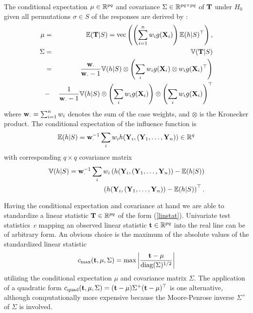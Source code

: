 \documentclass[letter]{article}
\begin{document}
The conditional expectation $\mu \in \mathbb{R}^{pq}$ and covariance 
$\Sigma \in \mathbb{R}^{pq \times pq}$ 
of $\mathbf{T}$ under $H_0$ given
all permutations $\sigma \in S$ of the responses are derived by
\cite{StrasserWeber1999}:
\begin{eqnarray}
\mu & = & \mathbb{E}(\mathbf{T} | S) = \text{vec} \left( \left( \sum_{i = 1}^n w_i g(\mathbf{X}_i) \right) \mathbb{E}(h | S)^\top
\right), \nonumber \\
\Sigma & = & \mathbb{V}(\mathbf{T} | S) \nonumber \\
& = &
    \frac{\mathbf{w}_\cdot}{\mathbf{w}_\cdot - 1}  \mathbb{V}(h | S) \otimes
        \left(\sum_i w_i  g(\mathbf{X}_i) \otimes w_i  g(\mathbf{X}_i)^\top \right)
\label{expectcovar}
\\
& - & \frac{1}{\mathbf{w}_\cdot - 1}  \mathbb{V}(h | S)  \otimes \left(
        \sum_i w_i g(\mathbf{X}_i) \right)
\otimes \left( \sum_i w_i g(\mathbf{X}_i)\right)^\top
\nonumber
\end{eqnarray}
where $\mathbf{w}_\cdot = \sum_{i = 1}^n w_i$ denotes the sum of the case weights,
and $\otimes$ is the Kronecker product. The conditional expectation of the
influence function is
\begin{eqnarray*}
\mathbb{E}(h | S) = \mathbf{w}_\cdot^{-1} \sum_i w_i h(\mathbf{Y}_i, (\mathbf{Y}_1, \dots, \mathbf{Y}_n)) \in
\mathbb{R}^q
\end{eqnarray*}
with corresponding $q \times q$ covariance matrix
\begin{eqnarray*}
\mathbb{V}(h | S) = \mathbf{w}_\cdot^{-1} \sum_i w_i \left(h(\mathbf{Y}_i, (\mathbf{Y}_1, \dots, \mathbf{Y}_n))
- \mathbb{E}(h | S)
\right) \\
\left(h(\mathbf{Y}_i, (\mathbf{Y}_1, \dots, \mathbf{Y}_n)) - \mathbb{E}(h | S)\right)^\top.
\end{eqnarray*}

Having the conditional expectation and covariance at hand we are able to
standardize a linear statistic $\mathbf{T} \in \mathbb{R}^{pq}$ of the form
(\ref{linstat}). Univariate test statistics~$c$ mapping an observed linear
statistic $\mathbf{t} \in
\mathbb{R}^{pq}$ into the real line can be of arbitrary form.  An obvious choice is
the maximum of the absolute values of the standardized linear statistic
\begin{eqnarray*}
c_\text{max}(\mathbf{t}, \mu, \Sigma)  = \max \left| \frac{\mathbf{t} -
\mu}{\text{diag}(\Sigma)^{1/2}} \right|
\end{eqnarray*}
utilizing the conditional expectation $\mu$ and covariance matrix
$\Sigma$. The application of a quadratic form $c_\text{quad}(\mathbf{t}, \mu,
\Sigma)  =
(\mathbf{t} - \mu) \Sigma^+ (\mathbf{t} - \mu)^\top$ is one alternative, although
computationally more expensive because the Moore-Penrose 
inverse $\Sigma^+$ of $\Sigma$ is involved.
\end{document}
